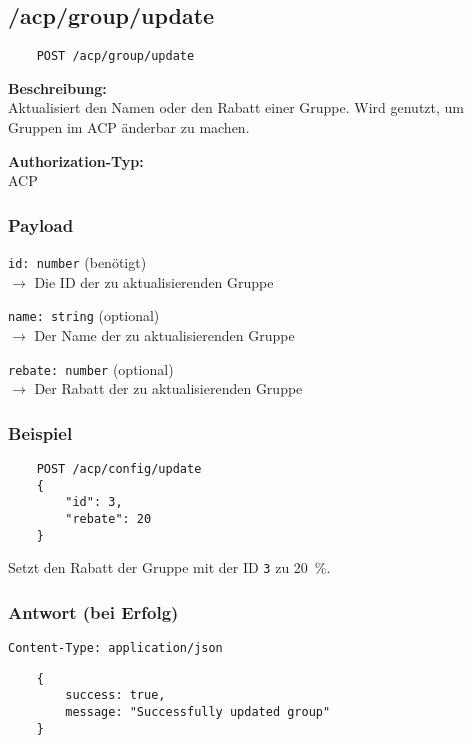 \subsection{/acp/group/update}

\begin{lstlisting}
    POST /acp/group/update
\end{lstlisting}

\textbf{Beschreibung:} \\
Aktualisiert den Namen oder den Rabatt einer Gruppe. Wird genutzt, um Gruppen im ACP änderbar zu machen.

\textbf{Authorization-Typ:} \\
ACP

\subsubsection{Payload}

\lstinline{id: number} (benötigt) \\
$\rightarrow$ Die ID der zu aktualisierenden Gruppe

\lstinline{name: string} (optional) \\
$\rightarrow$ Der Name der zu aktualisierenden Gruppe

\lstinline{rebate: number} (optional) \\
$\rightarrow$ Der Rabatt der zu aktualisierenden Gruppe

\subsubsection{Beispiel}

\begin{lstlisting}
    POST /acp/config/update
    {
        "id": 3,
        "rebate": 20
    }
\end{lstlisting}

Setzt den Rabatt der Gruppe mit der ID \lstinline{3} zu \SI{20}{\percent}.

\subsubsection{Antwort (bei Erfolg)}

\lstinline{Content-Type: application/json}
\begin{lstlisting}
    {
        success: true, 
        message: "Successfully updated group"
    }
\end{lstlisting}